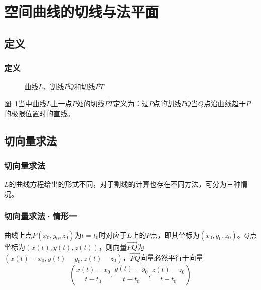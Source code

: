 \section{空间曲线的切线与法平面}
\subsection{定义}
\begin{frame}
    \frametitle{定义}

    \begin{figure}
        \centering
        \def\svgwidth{.5\columnwidth}
        
        \scalebox{.6}{}
        
        \caption{曲线$L$、割线$\overline{PQ}$和切线$\overline{PT}$\label{fig:tangent}}
    \end{figure}

    图~\ref{fig:tangent}当中曲线$L$上一点$P$处的切线$\overline{PT}$定义为：\alert{过$P$点的割线$\overline{PQ}$当$Q$点沿曲线趋于$P$的极限位置时的直线}。

\end{frame}

\subsection{切向量求法}
\begin{frame}
    \frametitle{切向量求法}

    $L$的曲线方程给出的形式不同，对于割线的计算也存在不同方法，可分为三种情况。

\end{frame}

\begin{frame}
    \frametitle{切向量求法·情形一}

    \begin{center}
    \end{center}\vfill\pause

    曲线上点$P(x_0,y_0,z_0)$为$t=t_0$时对应于$L$上的$P$点，即其坐标为$\left(x_0,y_0,z_0\right)$。$Q$点坐标为$\left(x(t),y(t),z(t)\right)$，则向量$\overrightarrow{PQ}$为$\left(x(t)−x_0,y(t)−y_0,z(t)−z_0\right)$，$\overrightarrow{PQ}$向量必然平行于向量
    \begin{equation}
        \left(\frac{x(t)-x_0}{t-t_0},\frac{y(t)-y_0}{t-t_0},\frac{z(t)-z_0}{t-t_0}\right)\label{eq:secant_vec}
    \end{equation}\vfill

\end{frame}

